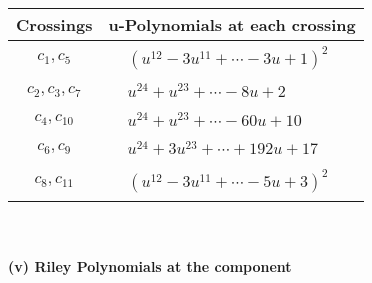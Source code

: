\documentclass[1p]{elsarticle_modified}
\theoremstyle{definition}
\begin{document}
\begin{tabular}{m{50pt}|m{274pt}}
Crossings & \hspace{64pt}u-Polynomials at each crossing \\
\hline $$\begin{aligned}c_{1},c_{5}\end{aligned}$$&$\begin{aligned}
&(u^{12}-3 u^{11}+\cdots-3 u+1)^{2}
\end{aligned}$\\
\hline $$\begin{aligned}c_{2},c_{3},c_{7}\end{aligned}$$&$\begin{aligned}
&u^{24}+u^{23}+\cdots-8 u+2
\end{aligned}$\\
\hline $$\begin{aligned}c_{4},c_{10}\end{aligned}$$&$\begin{aligned}
&u^{24}+u^{23}+\cdots-60 u+10
\end{aligned}$\\
\hline $$\begin{aligned}c_{6},c_{9}\end{aligned}$$&$\begin{aligned}
&u^{24}+3 u^{23}+\cdots+192 u+17
\end{aligned}$\\
\hline $$\begin{aligned}c_{8},c_{11}\end{aligned}$$&$\begin{aligned}
&(u^{12}-3 u^{11}+\cdots-5 u+3)^{2}
\end{aligned}$\\
\hline
\end{tabular}\\~\\
\newpage\renewcommand{\arraystretch}{1}
\flushleft \textbf{(v) Riley Polynomials at the component}\newline \\
\end{document}
